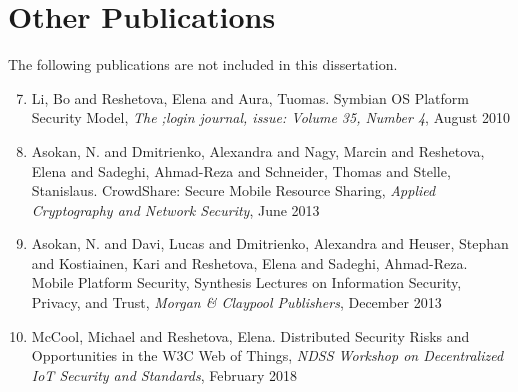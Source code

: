 \documentclass[dissertation,math,vertlayout]{aaltoseries}
\begin{document}
\clearpage
\tableofcontents


\listofpublications

\chapter*{Other Publications}%
%
The following publications are not included in this dissertation.
\begin{enumerate}%
		\setcounter{enumi}{6}
		\renewcommand{\labelenumi}{\bfseries\Roman{enumi}}%
		  \item Li, Bo and Reshetova, Elena and Aura, Tuomas. Symbian OS Platform Security Model, \textit{The ;login journal, issue: 
Volume 35, Number 4}, August 2010
			\item Asokan, N. and Dmitrienko, Alexandra and Nagy, Marcin and Reshetova, Elena and Sadeghi, Ahmad-Reza and Schneider, Thomas and Stelle, Stanislaus. CrowdShare: Secure Mobile Resource Sharing, \textit{Applied Cryptography and Network Security}, June 2013
			\item Asokan, N. and Davi, Lucas and Dmitrienko, Alexandra and Heuser, Stephan and Kostiainen, Kari and Reshetova, Elena and Sadeghi, Ahmad-Reza. Mobile Platform Security, Synthesis Lectures on Information Security, Privacy, and Trust, \textit{Morgan \& Claypool Publishers}, December 2013
			\item McCool, Michael and Reshetova, Elena. Distributed Security Risks and Opportunities in the W3C Web of Things, \textit{NDSS Workshop on Decentralized IoT Security and Standards}, February 2018
\end{enumerate}%
		
\end{document}

